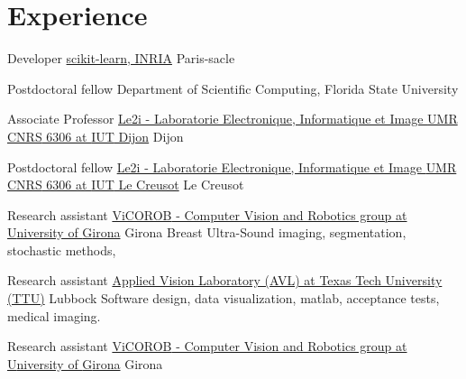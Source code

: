 
\section{Experience}

{Developer}
{\href{http://scikit-learn.org}{scikit-learn, INRIA}}
{}
{Paris-sacle}
{}

{Postdoctoral fellow}
{Department of Scientific Computing, Florida State University}
{}
{}
{}

{Associate Professor}
{\href{http://le2i.cnrs.fr/?lang=en}{Le2i - Laboratorie Electronique, Informatique et Image {UMR CNRS} 6306 at {IUT} Dijon}}
{}
{Dijon}
{}

{Postdoctoral fellow}
{\href{http://le2i.cnrs.fr/?lang=en}{Le2i - Laboratorie Electronique, Informatique et Image {UMR CNRS} 6306 at {IUT} Le Creusot}}
{}
{Le Creusot}
{}

{Research assistant}
{\href{http://vicorob.udg.edu}{{ViCOROB} - Computer Vision and Robotics group at {U}niversity of {G}irona}}
{}
{Girona}
{
  Breast Ultra-Sound imaging, segmentation, stochastic methods,  
}

{Research assistant}
{\href{http://www.depts.ttu.edu/ece/groups/appliedvision/}{Applied Vision Laboratory (AVL) at Texas Tech University (TTU)}}
{}
{Lubbock}
{
Software design, data visualization, matlab, acceptance tests, medical imaging.
}

{Research assistant}
{\href{http://vicorob.udg.edu}{{ViCOROB} - Computer Vision and Robotics group at {U}niversity of {G}irona}}
{}
{Girona}
{}


